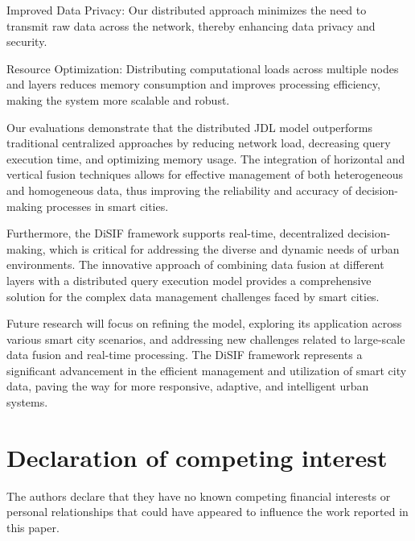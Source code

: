 \documentclass[5p,times]{elsarticle}
\begin{document}
Improved Data Privacy: Our distributed approach minimizes the need to transmit raw data across the network, thereby enhancing data privacy and security.

Resource Optimization: Distributing computational loads across multiple nodes and layers reduces memory consumption and improves processing efficiency, making the system more scalable and robust.

Our evaluations demonstrate that the distributed JDL model outperforms traditional centralized approaches by reducing network load, decreasing query execution time, and optimizing memory usage. The integration of horizontal and vertical fusion techniques allows for effective management of both heterogeneous and homogeneous data, thus improving the reliability and accuracy of decision-making processes in smart cities.

Furthermore, the DiSIF framework supports real-time, decentralized decision-making, which is critical for addressing the diverse and dynamic needs of urban environments. The innovative approach of combining data fusion at different layers with a distributed query execution model provides a comprehensive solution for the complex data management challenges faced by smart cities.

Future research will focus on refining the model, exploring its application across various smart city scenarios, and addressing new challenges related to large-scale data fusion and real-time processing. The DiSIF framework represents a significant advancement in the efficient management and utilization of smart city data, paving the way for more responsive, adaptive, and intelligent urban systems.

\section{Declaration of competing interest}

The authors declare that they have no known competing financial
interests or personal relationships that could have appeared
to influence the work reported in this paper.


\end{document}
